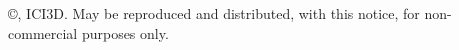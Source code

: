 \copyright \years, ICI3D.  May be reproduced and distributed, with this notice, for non-commercial purposes only.
